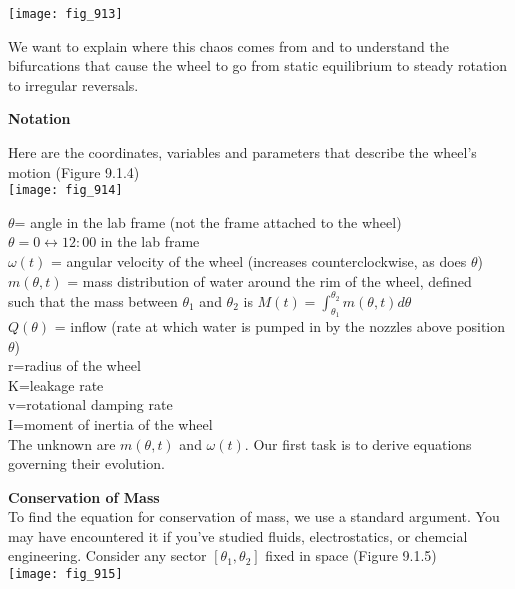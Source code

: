 \documentclass{article}
\newcommand\tab[1][1cm]{\hspace*{#1}}
\begin{document}
\texttt{[image: fig\_913]}

We want to explain where this chaos comes from and to understand the bifurcations that cause the wheel to go from static equilibrium to steady rotation to irregular reversals. 

\textbf {Notation}

Here are the coordinates, variables and parameters that describe the wheel's motion (Figure 9.1.4) \\

\texttt{[image: fig\_914]}

$\theta$= angle in the lab frame (not the frame attached to the wheel) \\
$\theta=0 \leftrightarrow 12:00$ in the lab frame \\
$\omega (t)$ = angular velocity of the wheel (increases counterclockwise, as does $\theta$) \\
$m(\theta , t)$ = mass distribution of water around the rim of the wheel, defined \\
such that the mass between $\theta_{1}$ and $\theta_{2}$ is $M(t)=\int_{\theta_{1}}^{\theta_{2}}m(\theta , t)d\theta$ \\
$Q(\theta)$ = inflow (rate at which water is pumped in by the nozzles above position $\theta$) \\ 
r=radius of the wheel \\ 
K=leakage rate \\
v=rotational damping rate \\
I=moment of inertia of the wheel \\
The unknown are $m(\theta , t)$ and $\omega (t)$. Our first task is to derive equations governing their evolution.

\textbf {Conservation of Mass} \\ \tab
To find the equation for conservation of mass, we use a standard argument. You may have encountered it if you've studied fluids, electrostatics, or chemcial engineering. Consider any sector $[\theta_{1}, \theta_{2}]$ fixed in space (Figure 9.1.5) \\
\texttt{[image: fig\_915]}
\end{document}
